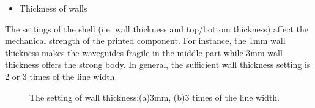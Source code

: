 \begin{itemize}
\item Thickness of walls
\end{itemize}
The settings of the shell (i.e. wall thickness and top/bottom thickness) affect the mechanical strength of the printed component. For instance, the 1mm wall thickness makes the waveguides fragile in the middle part while 3mm wall thickness offers the strong body. In general, the sufficient wall thickness setting is 2 or 3 times of the line width. 
\begin{figure}[t] %
	\centering

  \caption[The setting of wall thickness]{\footnotesize The setting of wall thickness:(a)3mm, (b)3 times of the line width. }
  \label{Fig:thickness}
\end{figure}


